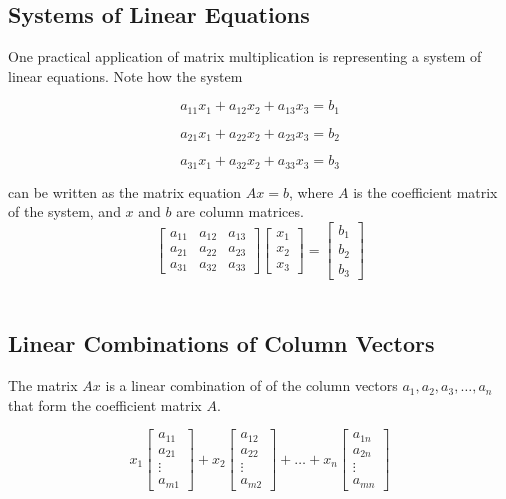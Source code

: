 \documentclass{report}
\begin{document}
\subsection{Systems of Linear Equations}

One practical application of matrix multiplication is representing a system of linear equations. Note how the system

$$
a_{11} x_1 + a_{12} x_2 + a_{13} x_3 = b_1
$$

$$
a_{21} x_1 + a_{22} x_2 + a_{23} x_3 = b_2
$$

$$
a_{31} x_1 + a_{32} x_2 + a_{33} x_3 = b_3
$$

\noindent can be written as the matrix equation $Ax=b$, where $A$ is the coefficient matrix of the system, and $x$ and $b$ are column matrices.\\

\[
\begin{bmatrix}
    a_{11} & a_{12} & a_{13} \\
    a_{21} & a_{22} & a_{23} \\
    a_{31} & a_{32} & a_{33} 
\end{bmatrix}
\begin{bmatrix}
    x_1 \\
    x_2 \\
    x_3
\end{bmatrix}
=
\begin{bmatrix}
    b_1 \\
    b_2 \\
    b_3
\end{bmatrix}
\]\\

\subsection{Linear Combinations of Column Vectors}

The matrix $Ax$ is a linear combination of of the column vectors $a_1,a_2,a_3,\hdots, a_n$ that form the coefficient matrix $A$.

\[
x_1 
\begin{bmatrix}
a_{11}\\
a_{21}\\
\vdots \\
a_{m1}
\end{bmatrix} 
+
x_2 
\begin{bmatrix}
a_{12}\\
a_{22}\\
\vdots \\
a_{m2}
\end{bmatrix} 
+
\hdots
+
x_n 
\begin{bmatrix}
a_{1n}\\
a_{2n}\\
\vdots \\
a_{mn}
\end{bmatrix} 
\]\\
\end{document}
